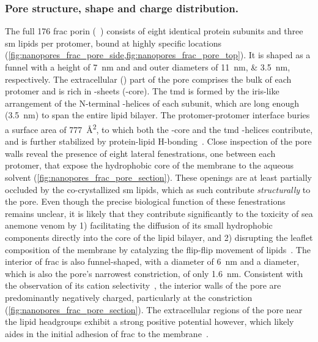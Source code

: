 \subsubsection{Pore structure, shape and charge distribution.}
%

The full \SI{176}{\kDa} \Gls{frac} porin (~\cite{Tanaka-2015}) consists of eight identical protein
subunits and three \gls{sm} lipids per protomer, bound at highly specific locations
(\cref{fig:nanopores_frac_pore_side,fig:nanopores_frac_pore_top}). It is shaped as a funnel with a height of
\SI{7}{\nm} and \cisi{} and \transi{} outer diameters of \SIlist{11;3.5}{\nm}, respectively. The extracellular
(\cisi) part of the pore comprises the bulk of each protomer and is rich in \tb-sheets (\tb-core). The
\gls{tmd} is formed by the iris-like arrangement of the N-terminal \ta-helices of each subunit, which are long
enough (\SI{3.5}{\nm}) to span the entire lipid bilayer. The protomer-protomer interface buries a surface area
of \SI{777}{\square\angstrom}, to which both the \tb-core and the \gls{tmd} \ta-helices contribute, and is
further stabilized by protein-lipid H-bonding~\cite{Tanaka-2015}. Close inspection of the pore walls reveal
the presence of eight lateral fenestrations, one between each protomer, that expose the hydrophobic core of
the membrane to the aqueous solvent (\cref{fig:nanopores_frac_pore_section}). These openings are at least
partially occluded by the co-crystallized \gls{sm} lipids, which as such contribute \emph{structurally} to the
pore. Even though the precise biological function of these fenestrations remains unclear, it is likely that
they contribute significantly to the toxicity of sea anemone venom by 1) facilitating the diffusion of its
small hydrophobic components directly into the core of the lipid bilayer, and 2) disrupting the leaflet
composition of the membrane by catalyzing the flip-flip movement of lipids~\cite{Tanaka-2015}. The interior of
\gls{frac} is also funnel-shaped, with a \cisi{} diameter of \SI{6}{\nm} and a \trans{} diameter, which is
also the pore's narrowest constriction, of only \SI{1.6}{\nm}. Consistent with the observation of its cation
selectivity~\cite{Garcia-Ortega-2011,Wloka-2016}, the interior walls of the pore are predominantly negatively
charged, particularly at the \transi{} constriction (\cref{fig:nanopores_frac_pore_section}). The
extracellular regions of the pore near the lipid headgroups exhibit a strong positive potential however, which
likely aides in the initial adhesion of \gls{frac} to the membrane~\cite{Tanaka-2015}.



